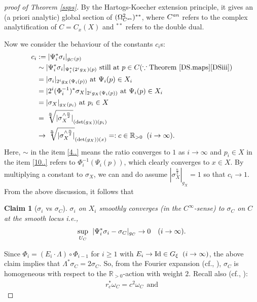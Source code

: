 \documentclass[12pt,a4paper]{amsart}
\newtheorem{Claim}[Thm]{Claim}
\theoremstyle{remark}
\theoremstyle{definition}
\def\R{\mathbb{R}}
\begin{document}
\begin{proof}[proof of Theorem \ref{ssps}]
By the Hartogs-Koecher extension 
principle, it gives an (a priori analytic) 
global section of 
$(\Omega_{C^{\it an}}^2)^{**}$, 
where $C^{\it an}$ refers to the complex analytification of 
$C=C_x(X)$ and ${}^{**}$ refers to 
the double dual. 

Now we consider the behaviour of the constants $c_i$s: 
\begin{align}
c_i&:=|\Psi_i^* \sigma_i|_{g_C(p)}\\
   &\label{4..} \sim |\Psi_i^* \sigma_i|_{\Psi_i^* (2^i g_X)(p)} \text{ still at }p\in C (\because \text{Theorem }\ref{DS.maps} \eqref{DSiii})\\ 
   &=|\sigma_i|_{2^i g_X(\Psi_i(p))} \text{ at }\Psi_i(p)\in X_i\\ 
   &=|2^i (\Phi_i^{-1})^* \sigma_X|_{2^i g_X(\Psi_i(p))} \text{ at }\Psi_i(p)\in X_i\\
   &\label{10..}=|\sigma_X|_{g_X(p_i)} \text{ at }p_i\in X\\ 
   &=\sqrt[\frac{n}{2}]{|\sigma_X^{\wedge \frac{n}{2}}|}_{({\rm det}(g_X))(p_i)}
   \\ 
   &\to \sqrt[\frac{n}{2}]{|\sigma_X^{\wedge \frac{n}{2}}|}_{({\rm det}(g_X))(x)}=:c \in \R_{>0}  \hspace{2mm} (i\to \infty). 
\end{align}
Here, $\sim$ in the item \eqref{4..}
means the ratio converges to $1$ as $i\to \infty$ and 
$p_i\in X$ in the item \eqref{10..} refers to $\Phi_i^{-1}(\Psi_i(p))$, 
which clearly converges to $x\in X$. 
By multiplying a constant to $\sigma_X$, 
we can and do assume 
$|\sigma_X^{\frac{n}{2}}|_{g_X}=1$ so that $c_i\to 1$. 
From the above discussion, it follows that 
\begin{Claim}[$\sigma_i$ vs $\sigma_C$]\label{XCcomp}
$\sigma_i$ on $X_i$ smoothly converges (in the $C^{\infty}$-sense) to $\sigma_C$ on $C$ 
at the smooth locus i.e., 
$$\sup_{U_C}\hspace{1.5mm}|\Psi_i^*\sigma_i-\sigma_C|_{g_C}\to 0 \quad (i\to \infty).$$
\end{Claim}
Since $\Phi_{i}=(E_i\cdot \Lambda)\circ \Phi_{i-1}$ for $i\ge 1$ 
with $E_i\to {\rm Id}\in G_\xi \hspace{2mm} (i\to \infty)$, 
the above claim implies that 
$\Lambda^*\sigma_C=2\sigma_C$. 
So, from the Fourier expansion 
(cf., \cite[pp.340-342]{DSII}), 
$\sigma_C$ is 
homogeneous with respect to the $\R_{>0}$-action 
with weight $2$. 
Recall also (cf., \cite{CS, CS2, 
LLX}): 
\begin{align}\label{weight 2}    
r_c^* \omega_C=c^2 \omega_C \:\: \text{and} 

\end{align}
\end{proof}
\end{document}
